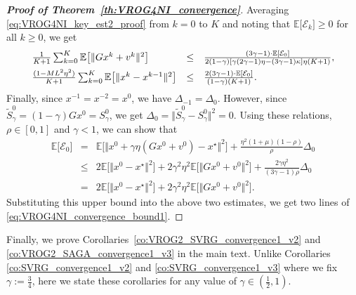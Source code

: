 \documentclass{article}
\newcommand{\norms}[1]{\Vert#1\Vert}
\newcommand{\Expk}[1]{\mathbb{E}\big[#1\big]}
\newcommand{\Ec}{\mathcal{E}}
\newcommand{\mbb}[1]{\mathbb{#1}}
\theoremstyle{plain}
\theoremstyle{definition}
\theoremstyle{remark}
\begin{document}
\begin{proof}[\textbf{Proof of Theorem~\ref{th:VROG4NI_convergence}}]
Averaging  \eqref{eq:VROG4NI_key_est2_proof} from $k=0$ to $K$ and noting that $\Expk{\Ec_k} \geq 0$ for all $k\geq 0$, we get
\begin{equation*} 
\begin{array}{lcl}
\frac{1}{K+1}\sum_{k=0}^{K} \Expk{ \norms{Gx^{k} + v^k}^2 }  & \leq &  \frac{ (3\gamma - 1) \cdot \mbb{E}[ \Ec_0 ] }{2(1-\gamma)[ \gamma(2\gamma-1)\eta - (3\gamma-1)\kappa] \eta (K + 1)}, \vspace{1ex} \\
\frac{(1 - M L^2\eta^2) }{K+1}\sum_{k=0}^{K} \Expk{ \norms{x^k - x^{k-1}}^2 } & \leq & \frac{ 2(3\gamma-1) \cdot \mbb{E}[ \Ec_0 ] }{(1-\gamma)(K + 1)}.
\end{array}
\end{equation*}
Finally, since $x^{-1} = x^{-2} = x^0$, we have $\Delta_{-1} = \Delta_0$.
However, since $\widetilde{S}^0_{\gamma}  =  (1-\gamma)Gx^0 = S_{\gamma}^0$, we get $\Delta_0 = \norms{\widetilde{S}^0_{\gamma} - S_{\gamma}^0}^2 = 0$. 
Using these relations, $\rho \in [0, 1]$ and $\gamma < 1$, we can show that
\begin{equation*}
\begin{array}{lcl}
\Expk{ \Ec_0 } & = & \Expk{ \norms{x^0 + \gamma \eta (Gx^{0} + v^0) - x^{\star}}^2 } +  \frac{ \eta^2(1+\mu)(1-\rho)}{\rho} \Delta_0 \\
& \leq &  2 \Expk{ \norms{x^0 - x^{\star}}^2 } + 2\gamma^2\eta^2 \Expk{ \norms{Gx^0 + v^0}^2}  +  \frac{2\gamma \eta^2}{(3\gamma-1)\rho} \Delta_0 \\
& = &  2 \Expk{ \norms{x^0 - x^{\star}}^2 } + 2\gamma^2\eta^2 \Expk{ \norms{Gx^0 + v^0}^2}.
\end{array}
\end{equation*}
Substituting this upper bound into the above two estimates, we get two lines of \eqref{eq:VROG4NI_convergence_bound1}.
\end{proof}

Finally, we prove Corollaries~\ref{co:VROG2_SVRG_convergence1_v2} and \ref{co:VROG2_SAGA_convergence1_v3} in the main text.
Unlike Corollaries \ref{co:SVRG_convergence1_v2} and \ref{co:SVRG_convergence1_v3} where we fix $\gamma := \frac{3}{4}$, here we state these corollaries for any value of $\gamma \in \left(\frac{1}{2}, 1\right)$.
\end{document}
